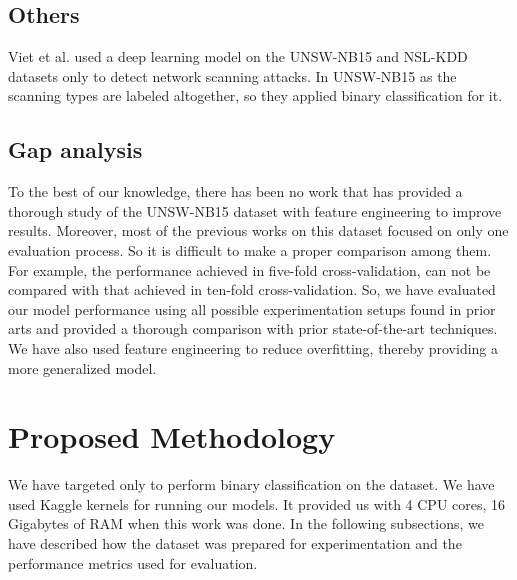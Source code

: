 \documentclass[14pt, conference]{IEEEtran}
\begin{document}
\subsection{Others}
Viet et al. \cite{viet2018using} used a deep learning model on the UNSW-NB15 and NSL-KDD datasets only to detect network scanning attacks. In UNSW-NB15 as the scanning types are
labeled altogether, so they applied binary classification for it.


\subsection{Gap analysis}
To the best of our knowledge, there has been no work that has provided a thorough study of the UNSW-NB15 dataset with feature engineering to improve results. Moreover, most of the previous works on this dataset focused on only one evaluation process. So it is difficult to make a proper comparison among them. For example, the performance achieved in five-fold cross-validation, can not be compared with that achieved in ten-fold cross-validation. So, we have evaluated our model performance using all possible experimentation setups found in prior arts and provided a thorough comparison with prior state-of-the-art techniques. We have also used feature engineering to reduce overfitting, thereby providing a more generalized model.



\section{Proposed Methodology} \label{methodology}
We have targeted only to perform binary classification on the dataset. We have used Kaggle kernels for running our models. It provided us with 4 CPU cores, 16 Gigabytes of RAM when this work was done. In the following subsections,  we have described how the dataset was prepared for experimentation and the performance metrics used for evaluation. 
\end{document}
